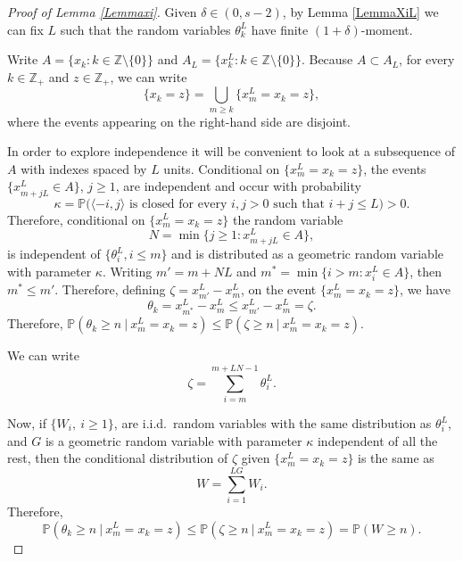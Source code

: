 \documentclass[a4paper,oneside,12pt]{amsart}
\renewcommand{\leq}{\leqslant}
\renewcommand{\geq}{\geqslant}
\theoremstyle{plain}
\theoremstyle{definition}
\theoremstyle{remark}
\renewcommand{\P}{\mathbb{P}}
\begin{document}
\begin{proof}[Proof of Lemma \ref{Lemmaxi}] Given $\delta \in (0, s-2)$, by Lemma \ref{LemmaXiL} we can fix $L$ such that the random variables $\theta_k^L$ have finite $(1+\delta)$-moment.

Write $A= \{x_k \colon k \in \mathbb{Z} \setminus \{0\}\}$ and $A_L = \{x_k^L \colon k \in \mathbb{Z} \setminus \{0\}\}$. 
Because $A \subset A_L$, for every $k \in \mathbb{Z}_{+}$ and $z\in \mathbb{Z}_+$, we can write
\[
\{x_k = z\} =  \bigcup_{m \geq k}\{x_m^L = x_k = z\},
\]
where the events appearing on the right-hand side are disjoint.

In order to explore independence it will be convenient to look at a subsequence of $A$ with indexes spaced by $L$ units.
Conditional on $\{x_m^L = x_k = z\}$, the events $\{x_{m+jL}^L \in A\}$, ${j \geq 1}$, are independent and occur with probability
\[
\kappa=\P\big(\text{$\langle -i,j \rangle$ is closed for every $i,j > 0$ such that $i+j \leq L$} \big)>0.
\]
Therefore, conditional on $\{x_m^L = x_k = z\}$ the random variable
\begin{equation*}
N = \min\{j \geq 1 \colon x_{m+jL}^L \in A\},
\end{equation*}
is independent of $\{\theta_i^L, i \leq m\}$ and is distributed as a geometric random variable with parameter $\kappa$.
Writing $m' = m+NL$ and $m^{\ast} = \min\{i > m \colon  x_i^L \in A\}$, then $m^{\ast} \leq m'$.
Therefore, defining $\zeta = x_{m'}^L - x_{m}^L$,
on the event $\{x_m^L = x_k = z\}$, we have
\[
\theta_k = x_{m^{\ast}}^L - x_{m}^L \leq x_{m'}^L - x_{m}^L = \zeta.
\] 
Therefore, $\P(\theta_k \geq n ~\vert~ x_m^L = x_k = z) \leq \P(\zeta \geq n ~\vert~ x_m^L = x_k = z)$.

We can write
\begin{equation*}
\zeta =  \sum_{i = m}^{m + LN - 1} \theta_{i}^L.
\end{equation*}

Now, if $\{W_i, ~i \geq 1\}$, are i.i.d.\ random variables with the same distribution as $\theta_i^L$, and $G$ is a geometric random variable with parameter $\kappa$ independent of all the rest, then
the conditional distribution of $\zeta$ given $\{x_m^L = x_k = z\}$ is the same as 
\[
W = \sum_{i=1}^{LG} W_i.
\]
Therefore,
\begin{equation*}
 \P\left(\theta_k \geq n ~\vert~ x_m^L = x_k = z\right) \leq \P\left(\zeta \geq n ~\vert~ x_m^L = x_k = z \right) = \P\left( W \geq n \right).
\end{equation*}
   

\end{proof}
\end{document}
